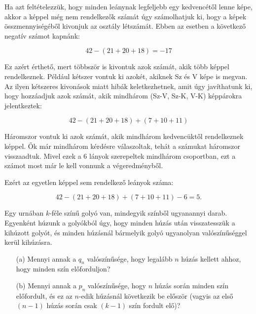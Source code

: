 \begin{solution}
Ha azt feltételezzük, hogy minden leánynak legfeljebb egy kedvencétől
lenne képe, akkor a képpel még nem rendelkezők számát úgy számolhatjuk
ki, hogy a képek összmennyiségéből kivonjuk az osztály létszámát.
Ebben az esetben a következő negatív számot kapnánk:

\[
42-(21+20+18)=-17
\]

Ez azért érthető, mert többször is kivontuk azok számát, akik több
képpel rendelkeznek. Például kétszer vontuk ki azokét, akiknek Sz
és V képe is megvan. Az ilyen kétszeres kivonások miatt hibák keletkezhetnek,
amit úgy javíthatunk ki, hogy hozzáadjuk azok számát, akik mindhárom
(Sz-V, Sz-K, V-K) képpárokra jelentkeztek:

\[
42-(21+20+18)+(7+10+11)
\]

Háromszor vontuk ki azok számát, akik mindhárom kedvencüktől rendelkeznek
képpel. Ők már mindhárom kérdésre válaszoltak, tehát a számukat háromszor
visszaadtuk. Mivel ezek a 6 lányok szerepeltek mindhárom csoportban,
ezt a számot most már le kell vonnunk a végeredményből.

Ezért az egyetlen képpel sem rendelkező leányok száma:

\[
42-(21+20+18)+(7+10+11)-6=5.
\]
\end{solution}
\begin{extraproblem}
Egy urnában $k$-féle színű golyó van, mindegyik színből ugyanannyi
darab. Egyenként húzunk a golyókból úgy, hogy minden húzás után visszatesszük
a kihúzott golyót, és minden húzásnál bármelyik golyó ugyanolyan valószínűséggel
kerül kihúzásra.
\begin{itemize}
\item[\foreignlanguage{english}{(a)}] Mennyi annak a $q_{n}$ valószínűsége, hogy legalább $n$ húzás kellett
ahhoz, hogy minden szín előforduljon? 
\item[\foreignlanguage{english}{(b)}] Mennyi annak a $p_{n}$ valószínűsége, hogy $n$ húzás során minden
szín előfordult, és ez az $n$-edik húzásnál következik be először
(vagyis az első $(n-1)$ húzás során csak $(k-1)$ szín fordult elő)? 
\end{itemize}
\end{extraproblem}

